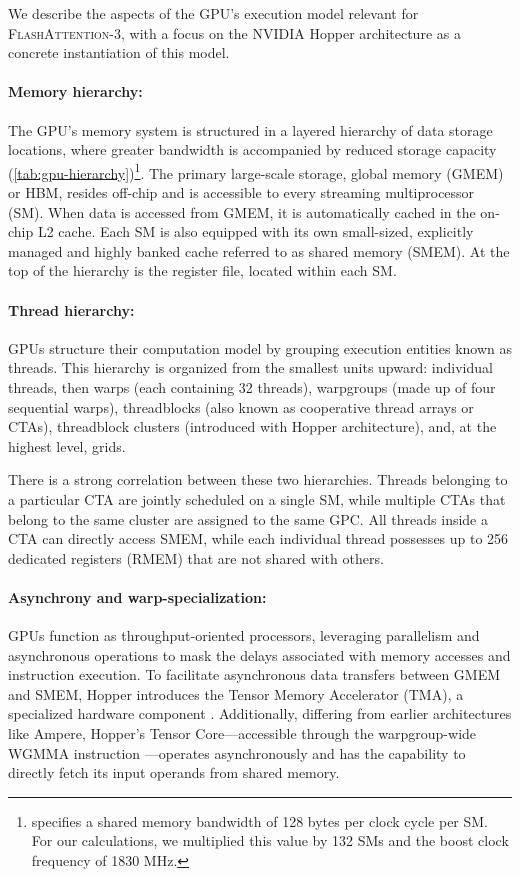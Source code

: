 We describe the aspects of the GPU's execution model relevant for \textsc{FlashAttention-3}, with a focus on the NVIDIA Hopper architecture as a concrete instantiation of this model.

\paragraph{Memory hierarchy:} The GPU's memory system is structured in a layered hierarchy of data storage locations, where greater bandwidth is accompanied by reduced storage capacity (\cref{tab:gpu-hierarchy})\footnote{\citet{luo2024benchmarking} specifies a shared memory bandwidth of 128 bytes per clock cycle per SM. For our calculations, we multiplied this value by 132 SMs and the boost clock frequency of 1830 MHz.}. The primary large-scale storage, global memory (GMEM) or HBM, resides off-chip and is accessible to every streaming multiprocessor (SM). When data is accessed from GMEM, it is automatically cached in the on-chip L2 cache. Each SM is also equipped with its own small-sized, explicitly managed and highly banked cache referred to as shared memory (SMEM). At the top of the hierarchy is the register file, located within each SM.

\paragraph{Thread hierarchy:} GPUs structure their computation model by grouping execution entities known as threads. This hierarchy is organized from the smallest units upward: individual threads, then warps (each containing 32 threads), warpgroups (made up of four sequential warps), threadblocks (also known as cooperative thread arrays or CTAs), threadblock clusters (introduced with Hopper architecture), and, at the highest level, grids.

There is a strong correlation between these two hierarchies. Threads belonging to a particular CTA are jointly scheduled on a single SM, while multiple CTAs that belong to the same cluster are assigned to the same GPC. All threads inside a CTA can directly access SMEM, while each individual thread possesses up to 256 dedicated registers (RMEM) that are not shared with others.

\paragraph{Asynchrony and warp-specialization:}

GPUs function as throughput-oriented processors, leveraging parallelism and asynchronous operations to mask the delays associated with memory accesses and instruction execution. To facilitate asynchronous data transfers between GMEM and SMEM, Hopper introduces the Tensor Memory Accelerator (TMA), a specialized hardware component \cite[\S7.29]{cuda}. Additionally, differing from earlier architectures like Ampere, Hopper’s Tensor Core—accessible through the warpgroup-wide WGMMA instruction \cite[\S9.7.14]{ptx}—operates asynchronously and has the capability to directly fetch its input operands from shared memory.

